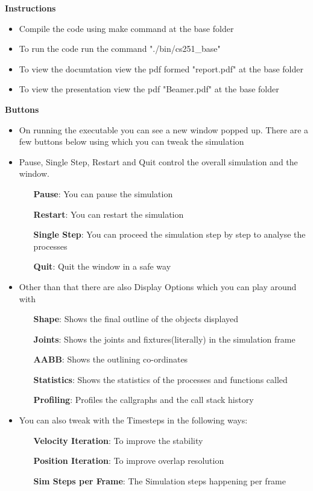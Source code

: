 \documentclass[]{report}
\begin{document}
\textbf{Instructions}
\begin{itemize}
\item Compile the code using make command at the base folder
\item To run the code run the command "./bin/cs251\_base"
\item To view the documtation view the pdf formed "report.pdf" at the base folder
\item To view the presentation view the pdf "Beamer.pdf" at the base folder
\end{itemize}
\textbf{Buttons}
\begin{itemize}
\item On running the executable you can see a new window popped up. There are a few buttons below using which you can tweak the simulation
\item Pause, Single Step, Restart and Quit control the overall simulation and the window.
\begin{itemize}
\item[\textbf{Pause}:] You can pause the simulation
\item[\textbf{Restart}:] You can restart the simulation
\item[\textbf{Single Step}:] You can proceed the simulation step by step to analyse the processes
\item[\textbf{Quit}:] Quit the window in a safe way
\end{itemize}
\item Other than that there are also Display Options which you can play around with
\begin{itemize}
\item[\textbf{Shape}:] Shows the final outline of the objects displayed 
\item[\textbf{Joints}:] Shows the joints and fixtures(literally) in the simulation frame 
\item[\textbf{AABB}:] Shows the outlining co-ordinates 
\item[\textbf{Statistics}:] Shows the statistics of the processes and functions called
\item[\textbf{Profiling}:] Profiles the callgraphs and the call stack history
\end{itemize}
\item You can also tweak with the Timesteps in the following ways:
\begin{itemize}
\item[\textbf{Velocity Iteration}:] To improve the stability
\item[\textbf{Position Iteration}:] To improve overlap resolution
\item[\textbf{Sim Steps per Frame}:]The Simulation steps happening per frame
\end{itemize}
\end{itemize}
\newpage
\end{document}
